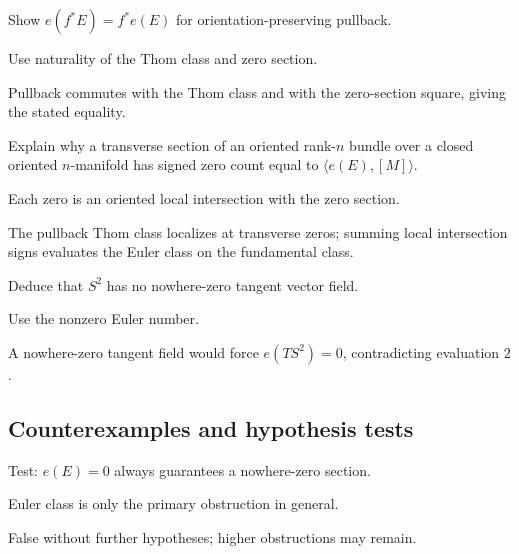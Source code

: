 \begin{exercise}\label{exr:viii32-ped-07}
Show $e(f^*E)=f^*e(E)$ for orientation-preserving pullback.
\end{exercise}
\begin{hint}
Use naturality of the Thom class and zero section.
\end{hint}
\begin{solution}
Pullback commutes with the Thom class and with the zero-section square, giving the stated equality.
\end{solution}

\begin{exercise}\label{exr:viii32-ped-08}
Explain why a transverse section of an oriented rank-$n$ bundle over a closed oriented $n$-manifold has signed zero count equal to $\langle e(E),[M]\rangle$.
\end{exercise}
\begin{hint}
Each zero is an oriented local intersection with the zero section.
\end{hint}
\begin{solution}
The pullback Thom class localizes at transverse zeros; summing local intersection signs evaluates the Euler class on the fundamental class.
\end{solution}

\begin{exercise}\label{exr:viii32-ped-09}
Deduce that $S^2$ has no nowhere-zero tangent vector field.
\end{exercise}
\begin{hint}
Use the nonzero Euler number.
\end{hint}
\begin{solution}
A nowhere-zero tangent field would force $e(TS^2)=0$, contradicting evaluation $2$.
\end{solution}

\subsection*{Counterexamples and hypothesis tests}

\begin{exercise}\label{exr:viii32-ped-10}
Test: $e(E)=0$ always guarantees a nowhere-zero section.
\end{exercise}
\begin{hint}
Euler class is only the primary obstruction in general.
\end{hint}
\begin{solution}
False without further hypotheses; higher obstructions may remain.
\end{solution}

